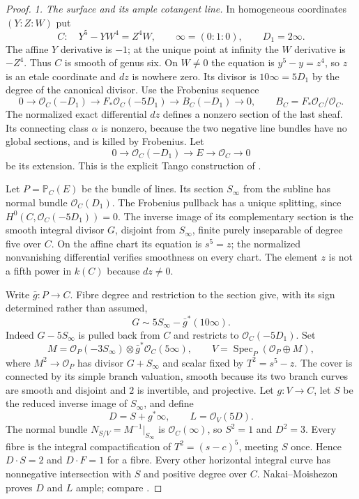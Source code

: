 \begin{proof}
\emph{1. The surface and its ample cotangent line.}
In homogeneous coordinates $(Y:Z:W)$ put
\[
 C:\quad Y^5-YW^4=Z^4W,\qquad
 \infty=(0:1:0),\qquad D_1=2\infty.
\]
The affine $Y$ derivative is $-1$; at the unique point at infinity
the $W$ derivative is $-Z^4$. Thus $C$ is smooth of genus six.
On $W\ne0$ the equation is $y^5-y=z^4$, so $z$ is an etale
coordinate and $dz$ is nowhere zero. Its divisor is
$10\infty=5D_1$ by the degree of the canonical divisor.
Use the Frobenius sequence
\[
 0\longrightarrow\mathcal O_C(-D_1)
 \longrightarrow F_*\mathcal O_C(-5D_1)
 \longrightarrow B_C(-D_1)\longrightarrow0,
 \qquad B_C=F_*\mathcal O_C/\mathcal O_C.
\]
The normalized exact differential $dz$ defines a nonzero section
of the last sheaf. Its connecting class $\alpha$ is nonzero,
because the two negative line bundles have no global sections,
and is killed by Frobenius. Let
\[
 0\longrightarrow\mathcal O_C(-D_1)\longrightarrow E
                 \longrightarrow\mathcal O_C\longrightarrow0
                                                        \tag{C.3an.1}
\]
be its extension. This is the explicit Tango construction of
\citet[Example~1.3, Lemma~1.4 and Section~1.3, author pp.~3--6]
{D_Mukai2011}.

Let $P=\mathbb P_C(E)$ be the bundle of lines. Its section
$S_\infty$ from the subline has normal bundle
$\mathcal O_C(D_1)$. The Frobenius pullback has a unique
splitting, since $H^0(C,\mathcal O_C(-5D_1))=0$.
The inverse image of its complementary section is the smooth
integral divisor $G$, disjoint from $S_\infty$, finite purely
inseparable of degree five over $C$. On the affine chart its
equation is $s^5=z$; the normalized nonvanishing differential
verifies smoothness on every chart. The element $z$ is not
a fifth power in $k(C)$ because $dz\ne0$.

Write $\bar g:P\to C$. Fibre degree and restriction to the
section give, with its sign determined rather than assumed,
\[
                G\sim5S_\infty-\bar g^*(10\infty).
                                                        \tag{C.3an.2}
\]
Indeed $G-5S_\infty$ is pulled back from $C$ and restricts to
$\mathcal O_C(-5D_1)$. Set
\[
 M=\mathcal O_P(-3S_\infty)\otimes\bar g^*\mathcal O_C(5\infty),
 \qquad V=\operatorname{Spec}_P(\mathcal O_P\oplus M),
                                                        \tag{C.3an.3}
\]
where $M^2\to\mathcal O_P$ has divisor $G+S_\infty$ and scalar
fixed by $T^2=s^5-z$. The cover is connected by its simple
branch valuation, smooth because its two branch curves are
smooth and disjoint and $2$ is invertible, and projective.
Let $g:V\to C$, let $S$ be the reduced inverse image of
$S_\infty$, and define
\[
                 D=S+g^*\infty,\qquad L=\mathcal O_V(5D).
                                                        \tag{C.3an.4}
\]
The normal bundle $N_{S/V}=M^{-1}|_{S_\infty}$ is
$\mathcal O_C(\infty)$, so $S^2=1$ and $D^2=3$.
Every fibre is the integral compactification of
$T^2=(s-c)^5$, meeting $S$ once. Hence $D\cdot S=2$ and
$D\cdot F=1$ for a fibre. Every other horizontal integral
curve has nonnegative intersection with $S$ and positive
degree over $C$. Nakai--Moishezon proves $D$ and $L$ ample;
compare \citet[Lemma~2.2, author p.~8]{D_Mukai2011}.


\end{proof}
